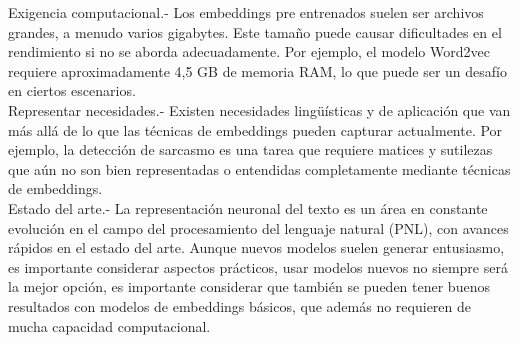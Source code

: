 \begin{itemize}
Exigencia computacional.- Los embeddings pre entrenados suelen ser archivos grandes, a menudo varios gigabytes. Este tamaño puede causar dificultades en el rendimiento si no se aborda adecuadamente. Por ejemplo, el modelo Word2vec requiere aproximadamente 4,5 GB de memoria RAM, lo que puede ser un desafío en ciertos escenarios.
\\
Representar necesidades.- Existen necesidades lingüísticas y de aplicación que van más allá de lo que las técnicas de embeddings pueden capturar actualmente. Por ejemplo, la detección de sarcasmo es una tarea que requiere matices y sutilezas que aún no son bien representadas o entendidas completamente mediante técnicas de embeddings.\\

Estado del arte.- La representación neuronal del texto es un área en constante evolución en el campo del procesamiento del lenguaje natural (PNL), con avances rápidos en el estado del arte. Aunque nuevos modelos suelen generar entusiasmo, es importante considerar aspectos prácticos, usar modelos nuevos no siempre será la mejor opción, es importante considerar que también se pueden tener buenos resultados con modelos de embeddings básicos, que además no requieren de mucha capacidad computacional. 

\end{itemize}




